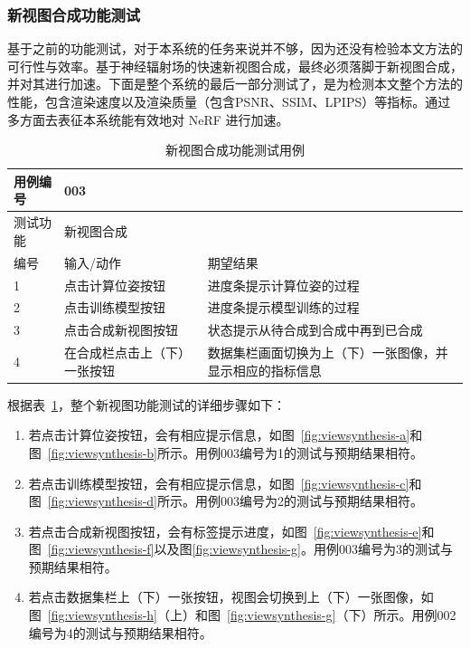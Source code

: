 \subsubsection{新视图合成功能测试}
基于之前的功能测试，对于本系统的任务来说并不够，因为还没有检验本文方法的可行性与效率。基于神经辐射场的快速新视图合成，最终必须落脚于新视图合成，并对其进行加速。下面是整个系统的最后一部分测试了，是为检测本文整个方法的性能，包含渲染速度以及渲染质量（包含PSNR、SSIM、LPIPS）等指标。通过多方面去表征本系统能有效地对 NeRF 进行加速。
\begin{table}[htbp]
  \centering
  \small{}\setlength{}
  \caption{新视图合成功能测试用例}
  \begin{tabular}{|p{2cm}<{\centering}|p{4cm}<{\centering}|p{4cm}<{\centering}|}
    \hline
    用例编号 & \multicolumn{2}{|l|}{003}       \\
    \hline
    测试功能 & \multicolumn{2}{|l|}{新视图合成}       \\
    \hline
    编号 & 输入/动作 & 期望结果 \\
    \hline
    1 & 点击计算位姿按钮 &  进度条提示计算位姿的过程 \\
    \hline
    2 & 点击训练模型按钮 &  进度条提示模型训练的过程 \\
    \hline
    3 & 点击合成新视图按钮 & 状态提示从待合成到合成中再到已合成 \\
    \hline
    4 & 在合成栏点击上（下）一张按钮 & 数据集栏画面切换为上（下）一张图像，并显示相应的指标信息 \\
    \hline
  \end{tabular}
  \label{tab:viewsynthesis}
\end{table}
根据表~\ref{tab:viewsynthesis}，整个新视图功能测试的详细步骤如下：
\begin{enumerate}
    \item[1)] 若点击计算位姿按钮，会有相应提示信息，如图~\ref{fig:viewsynthesis-a}和图~\ref{fig:viewsynthesis-b}所示。用例003编号为1的测试与预期结果相符。
    \item[2)] 若点击训练模型按钮，会有相应提示信息，如图~\ref{fig:viewsynthesis-c}和图~\ref{fig:viewsynthesis-d}所示。用例003编号为2的测试与预期结果相符。
    \item[3)] 若点击合成新视图按钮，会有标签提示进度，如图~\ref{fig:viewsynthesis-e}和图~\ref{fig:viewsynthesis-f}以及图\ref{fig:viewsynthesis-g}。用例003编号为3的测试与预期结果相符。
    \item[4)] 若点击数据集栏上（下）一张按钮，视图会切换到上（下）一张图像，如图~\ref{fig:viewsynthesis-h}（上）和图~\ref{fig:viewsynthesis-g}（下）所示。用例002编号为4的测试与预期结果相符。
\end{enumerate}
\newpage

